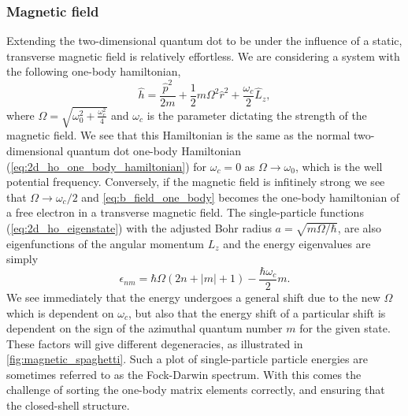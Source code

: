 \subsubsection{Magnetic field}

Extending the two-dimensional quantum dot to be under the influence of a 
static, transverse magnetic field is relatively effortless. We are considering a system with 
the following one-body hamiltonian,
\begin{equation}
    \label{eq:b_field_one_body}
    \hat{h} = \frac{\hat{p}^2}{2m} + \frac{1}{2}m\Omega^2\hat{r}^2 
        + \frac{\omega_c}{2}\hat{L}_z,   
\end{equation}
where $\Omega = \sqrt{\omega_0^2 + \frac{\omega_c^2}{4}}$ and $\omega_c$ is the 
parameter dictating the strength of the magnetic field. We see that this Hamiltonian
is the same as the normal two-dimensional quantum dot one-body Hamiltonian 
(\autoref{eq:2d_ho_one_body_hamiltonian}) for $\omega_c = 0$ as $\Omega \to \omega_0$,
which is the well potential frequency. Conversely, if the 
magnetic field is infitinely strong we see that $\Omega \to \omega_c/2$ and 
\autoref{eq:b_field_one_body} becomes the one-body hamiltonian of a free electron in 
a transverse magnetic field.
The single-particle functions 
(\autoref{eq:2d_ho_eigenstate}) with the adjusted Bohr radius $a=\sqrt{m\Omega/\hbar}$,
are also eigenfunctions of the angular momentum
$L_z$ and the energy eigenvalues are simply
\begin{equation}
    \label{eq:2d_b_eigenvalues}
    \epsilon_{nm} = \hbar\Omega(2n + |m| + 1) - \frac{\hbar\omega_c}{2}m.
\end{equation}
We see immediately that the energy undergoes a general shift due to the new $\Omega$
which is dependent on $\omega_c$, but also that the energy shift of a particular shift 
is dependent on the sign of the azimuthal quantum number $m$ for the given state. These 
factors will give different degeneracies, as illustrated in \autoref{fig:magnetic_spaghetti}.
Such a plot of single-particle particle energies are sometimes referred to as the 
Fock-Darwin spectrum\cite{fock1928bemerkung,darwin1931diamagnetism}.
With this comes the challenge of sorting the one-body matrix elements correctly, 
and ensuring that the closed-shell structure.


